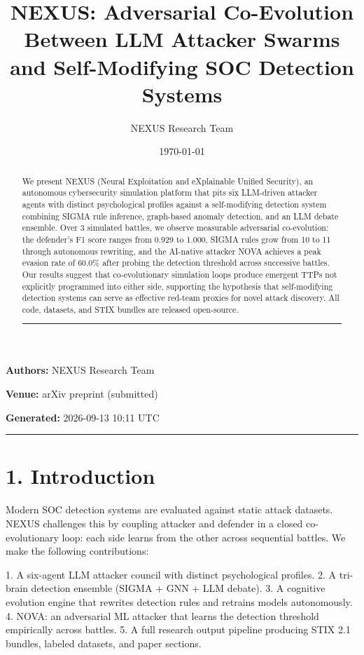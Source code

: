 \documentclass{article}
\title{NEXUS: Adversarial Co-Evolution Between LLM Attacker Swarms and Self-Modifying SOC Detection Systems}
\author{NEXUS Research Team}
\date{\today}
\begin{document}
\maketitle


\textbf{Authors:} NEXUS Research Team  

\textbf{Venue:} arXiv preprint (submitted)  

\textbf{Generated:} 2026-09-13 10:11 UTC  

\hrule\vspace{6pt}

\begin{abstract}

We present NEXUS (Neural Exploitation and eXplainable Unified Security), an autonomous cybersecurity simulation platform that pits six LLM-driven attacker agents with distinct psychological profiles against a self-modifying detection system combining SIGMA rule inference, graph-based anomaly detection, and an LLM debate ensemble. Over 3 simulated battles, we observe measurable adversarial co-evolution: the defender's F1 score ranges from 0.929 to 1.000, SIGMA rules grow from 10 to 11 through autonomous rewriting, and the AI-native attacker NOVA achieves a peak evasion rate of 60.0\% after probing the detection threshold across successive battles. Our results suggest that co-evolutionary simulation loops produce emergent TTPs not explicitly programmed into either side, supporting the hypothesis that self-modifying detection systems can serve as effective red-team proxies for novel attack discovery. All code, datasets, and STIX bundles are released open-source.


\hrule\vspace{6pt}

\end{abstract}

\section{1. Introduction}

Modern SOC detection systems are evaluated against static attack datasets. NEXUS challenges this by coupling attacker and defender in a closed co-evolutionary loop: each side learns from the other across sequential battles. We make the following contributions:

1. A six-agent LLM attacker council with distinct psychological profiles.
2. A tri-brain detection ensemble (SIGMA + GNN + LLM debate).
3. A cognitive evolution engine that rewrites detection rules and retrains models autonomously.
4. NOVA: an adversarial ML attacker that learns the detection threshold empirically across battles.
5. A full research output pipeline producing STIX 2.1 bundles, labeled datasets, and paper sections.
\end{document}
